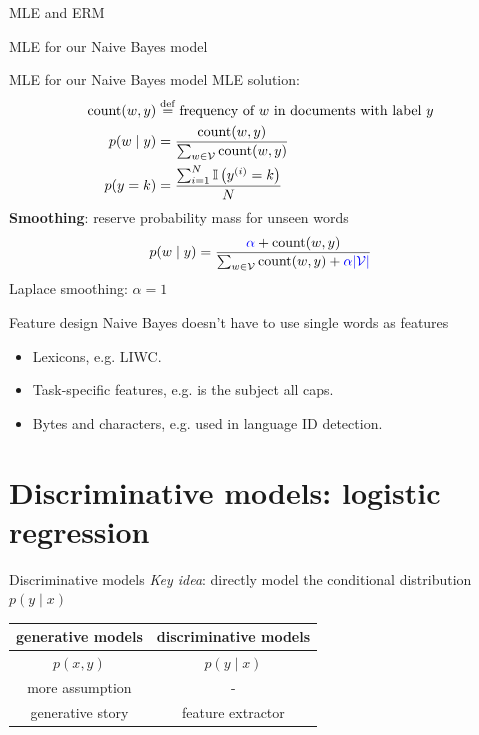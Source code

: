 \documentclass[usenames,dvipsnames,notes]{beamer}
\begin{document}
\begin{frame}
    {MLE and ERM}
\end{frame}

\begin{frame}
    {MLE for our Naive Bayes model}
\end{frame}

\begin{frame}
    {MLE for our Naive Bayes model}
    MLE solution:
    \begin{align*}
        \text{count}(w, y) &\stackrel{\rm def}{=} \text{frequency of $w$ in documents with label $y$}\\ 
        p(w\mid y) &= \frac{\text{count}(w, y)}{\sum_{w\in\mathcal{V}}\text{count}(w, y)}\\
        p(y=k) &= \frac{\sum_{i=1}^N \mathbb{I}\left( y^{(i)}=k \right)}{N}
    \end{align*}
    \pause
    \textbf{Smoothing}: reserve probability mass for unseen words
    $$
        p(w\mid y) = \frac{{\color{blue}\alpha} + \text{count}(w, y)}{\sum_{w\in\mathcal{V}}\text{count}(w, y) + {\color{blue}\alpha|\mathcal{V}|}}
    $$
    Laplace smoothing: $\alpha=1$
\end{frame}

\begin{frame}
    {Feature design}
        Naive Bayes doesn't have to use single words as features
    \begin{itemize}
        \itemsep1em
        \item Lexicons, e.g. LIWC.
        \item Task-specific features, e.g. is the subject all caps.
        \item Bytes and characters, e.g. used in language ID detection.
    \end{itemize}
\end{frame}

\section{Discriminative models: logistic regression}

\begin{frame}
    {Discriminative models}
    \emph{Key idea}: directly model the conditional distribution $p(y\mid x)$
    \begin{table}
        \renewcommand{\arraystretch}{1.5}
        \begin{tabular}{cc}
            generative models & discriminative models \\
            \hline
            $p(x,y)$ & $p(y\mid x)$ \\
            more assumption & - \\
            generative story & feature extractor
        \end{tabular}
    \end{table}
\end{frame}
\end{document}
